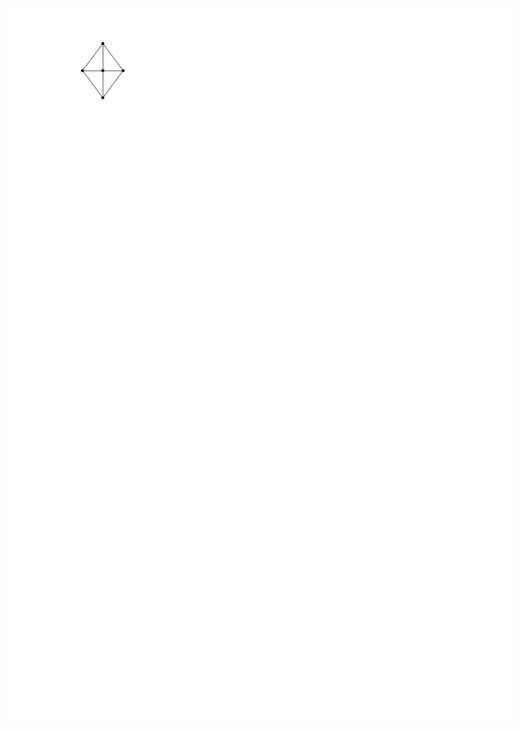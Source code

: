\documentclass[a4paper]{article}
\begin{document}
\includegraphics[scale=1]{./introduction/img/areaunivGraph.pdf}
\clearpage%
\end{document}
